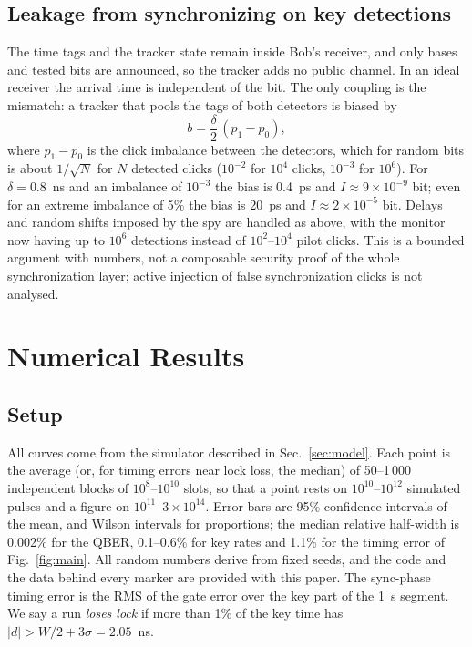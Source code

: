 \documentclass[journal]{IEEEtran}
\theoremstyle{plain}
\begin{document}
\subsection{Leakage from synchronizing on key detections}
The time tags and the tracker state remain inside Bob's receiver, and only bases and tested bits are announced, so the tracker adds no public channel. In an ideal receiver the arrival time is independent of the bit. The only coupling is the mismatch: a tracker that pools the tags of both detectors is biased by
\begin{equation}
b=\frac{\delta}{2}\,(p_1-p_0),
\end{equation}
where $p_1-p_0$ is the click imbalance between the detectors, which for random bits is about $1/\sqrt N$ for $N$ detected clicks ($10^{-2}$ for $10^4$ clicks, $10^{-3}$ for $10^6$). For $\delta=0.8$~ns and an imbalance of $10^{-3}$ the bias is 0.4~ps and $I\approx9\times10^{-9}$ bit; even for an extreme imbalance of 5\% the bias is 20~ps and $I\approx2\times10^{-5}$ bit. Delays and random shifts imposed by the spy are handled as above, with the monitor now having up to $10^6$ detections instead of $10^2$--$10^4$ pilot clicks. This is a bounded argument with numbers, not a composable security proof of the whole synchronization layer; active injection of false synchronization clicks is not analysed.

\section{Numerical Results}
\label{sec:results}
\subsection{Setup}
All curves come from the simulator described in Sec.~\ref{sec:model}. Each point is the average (or, for timing errors near lock loss, the median) of 50--1\,000 independent blocks of $10^{8}$--$10^{10}$ slots, so that a point rests on $10^{10}$--$10^{12}$ simulated pulses and a figure on $10^{11}$--$3\times10^{14}$. Error bars are 95\% confidence intervals of the mean, and Wilson intervals for proportions; the median relative half-width is 0.002\% for the QBER, 0.1--0.6\% for key rates and 1.1\% for the timing error of Fig.~\ref{fig:main}. All random numbers derive from fixed seeds, and the code and the data behind every marker are provided with this paper. The sync-phase timing error is the RMS of the gate error over the key part of the 1~s segment. We say a run \emph{loses lock} if more than 1\% of the key time has $|d|>W/2+3\sigma=2.05$~ns.
\end{document}

